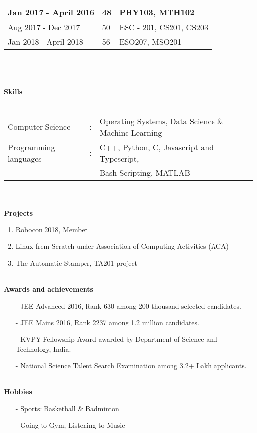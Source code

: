 \documentclass{article}
\begin{document}
\begin{flushleft}
\begin{tabular}{|l|l|l|}
		Jan 2017 - April 2016 & 48 & PHY103, MTH102\\
		\hline
		Aug 2017 - Dec 2017 & 50 & ESC - 201, CS201, CS203\\
		\hline
		Jan 2018 - April 2018 & 56 & ESO207, MSO201\\
		\hline
	\end{tabular}
	\hfill\\
	\hfill\\
	\hfill\\
	\textbf{Skills}\\
	\hfill\\
	\begin{tabular}{ l c l }
		Computer Science & : & Operating Systems, Data Science \& Machine Learning\\
		Programming languages & : &C++, Python, C, Javascript and Typescript, \\ &&Bash Scripting, MATLAB
	\end{tabular}
	\hfill\\
	\hfill\\
	\textbf{Projects}\\
	\begin{enumerate}
		\item Robocon 2018, Member
		\item Linux from Scratch under Association of Computing Activities (ACA)
		\item The Automatic Stamper, TA201 project 
	\end{enumerate}
	\hfill\\
	\textbf{Awards and achievements}\\
	\renewcommand{\labelitemi}{\textendash}
	\begin{itemize}
		\item[-] JEE Advanced 2016, Rank 630 among 200 thousand selected candidates.
		\item[-] JEE Mains 2016, Rank 2237 among 1.2 million candidates.
		\item[-] KVPY Fellowship Award awarded by Department of Science and Technology, India.
		\item[-] National Science Talent Search Examination among 3.2+ Lakh applicants.
	\end{itemize}
	\hfill\\
	\textbf{Hobbies}\\
	\begin{itemize}
		\item[-] Sports: Basketball \& Badminton 
		\item[-] Going to Gym, Listening to Music  
	\end{itemize}
\end{flushleft}
\end{document}
